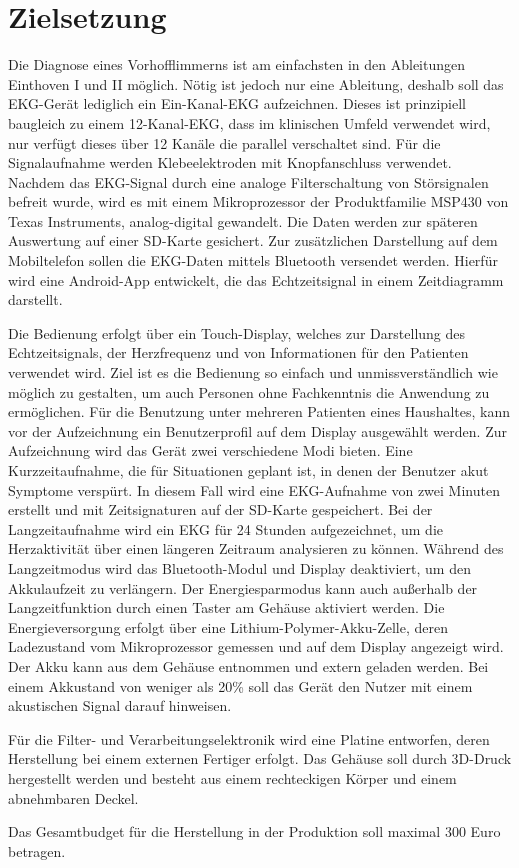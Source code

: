 
\section{Zielsetzung}

Die Diagnose eines Vorhofflimmerns ist am einfachsten in den Ableitungen Einthoven I und II möglich. Nötig ist jedoch nur eine Ableitung, deshalb soll das EKG-Gerät lediglich ein Ein-Kanal-EKG aufzeichnen. Dieses ist prinzipiell baugleich zu einem 12-Kanal-EKG, dass im klinischen Umfeld verwendet wird, nur verfügt dieses über 12 Kanäle die parallel verschaltet sind. Für die Signalaufnahme werden Klebeelektroden mit Knopfanschluss verwendet. Nachdem das EKG-Signal durch eine analoge Filterschaltung von Störsignalen befreit wurde, wird es mit einem Mikroprozessor der Produktfamilie MSP430 von Texas Instruments, analog-digital gewandelt. Die Daten werden zur späteren Auswertung auf einer SD-Karte gesichert. Zur zusätzlichen Darstellung auf dem Mobiltelefon sollen die EKG-Daten mittels Bluetooth versendet werden. Hierfür wird eine Android-App entwickelt, die das Echtzeitsignal in einem Zeitdiagramm darstellt.

Die Bedienung erfolgt über ein Touch-Display, welches zur Darstellung des Echtzeitsignals, der Herzfrequenz und von Informationen für den Patienten verwendet wird. Ziel ist es die Bedienung so einfach und unmissverständlich wie möglich zu gestalten, um auch Personen ohne Fachkenntnis die Anwendung zu ermöglichen. Für die Benutzung unter mehreren Patienten eines Haushaltes, kann vor der Aufzeichnung ein Benutzerprofil auf dem Display ausgewählt werden. Zur Aufzeichnung wird das Gerät zwei verschiedene Modi bieten. Eine Kurzzeitaufnahme, die für Situationen geplant ist, in denen der Benutzer akut Symptome verspürt. In diesem Fall wird eine EKG-Aufnahme von zwei Minuten erstellt und mit Zeitsignaturen auf der SD-Karte gespeichert. Bei der Langzeitaufnahme wird ein EKG für 24 Stunden aufgezeichnet, um die Herzaktivität über einen längeren Zeitraum analysieren zu können. Während des Langzeitmodus wird das Bluetooth-Modul und Display deaktiviert, um den Akkulaufzeit zu verlängern. Der Energiesparmodus kann auch außerhalb der Langzeitfunktion durch einen Taster am Gehäuse aktiviert werden. Die Energieversorgung erfolgt über eine Lithium-Polymer-Akku-Zelle, deren Ladezustand vom Mikroprozessor gemessen und auf dem Display angezeigt wird. Der Akku kann aus dem Gehäuse entnommen und extern geladen werden. Bei einem Akkustand von weniger als 20\% soll das Gerät den Nutzer mit einem akustischen Signal darauf hinweisen. 

Für die Filter- und Verarbeitungselektronik wird eine Platine entworfen, deren Herstellung bei einem externen Fertiger erfolgt. Das Gehäuse soll durch 3D-Druck hergestellt werden und besteht aus einem rechteckigen Körper und einem abnehmbaren Deckel.

Das Gesamtbudget für die Herstellung in der Produktion soll maximal 300 Euro betragen. 

